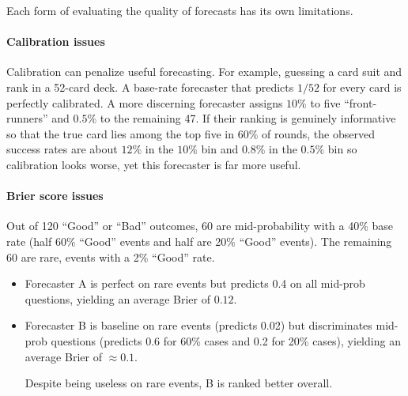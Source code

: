 \documentclass[12pt,a4paper]{article}
\begin{document}
Each form of evaluating the quality of forecasts has its own limitations. 

\paragraph{Calibration issues}
Calibration can penalize useful forecasting. For example, guessing a card suit and rank in a 52-card deck. A base-rate forecaster that predicts $1/52$ for every card is perfectly calibrated. A more discerning forecaster assigns $10\%$ to five ``front-runners'' and $0.5\%$ to the remaining 47. If their ranking is genuinely informative so that the true card lies among the top five in $60\%$ of rounds, the observed success rates are about $12\%$ in the $10\%$ bin and $0.8\%$ in the $0.5\%$ bin so calibration looks worse, yet this forecaster is far more useful.

\paragraph{Brier score issues}
Out of 120 ``Good'' or ``Bad'' outcomes, 60 are mid-probability with a 40\% base rate (half 60\% ``Good'' events and half are 20\% ``Good'' events). The remaining 60 are rare, events with a 2\% ``Good'' rate.  
\begin{itemize}
\item Forecaster A is perfect on rare events but predicts 0.4 on all mid-prob questions, yielding an average Brier of $0.12$. 
\item Forecaster B is baseline on rare events (predicts 0.02) but discriminates mid-prob questions (predicts 0.6 for 60\% cases and 0.2 for 20\% cases), yielding an average Brier of $\approx 0.1$. 

Despite being useless on rare events, B is ranked better overall.

\end{itemize}
\end{document}
